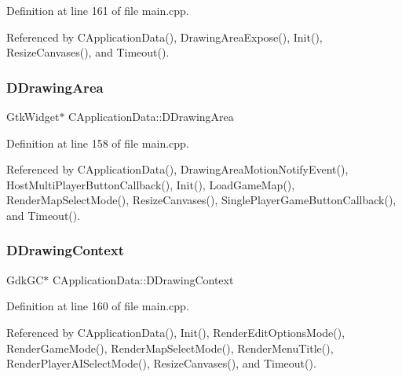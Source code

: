 Definition at line 161 of file main.\+cpp.



Referenced by C\+Application\+Data(), Drawing\+Area\+Expose(), Init(), Resize\+Canvases(), and Timeout().

\hypertarget{classCApplicationData_a4735f5d31632313e0b2a1659eb178987}{}\label{classCApplicationData_a4735f5d31632313e0b2a1659eb178987} 
\subsubsection{\texorpdfstring{D\+Drawing\+Area}{DDrawingArea}}
{\footnotesize\ttfamily Gtk\+Widget$\ast$ C\+Application\+Data\+::\+D\+Drawing\+Area\hspace{0.3cm}{\ttfamily [protected]}}



Definition at line 158 of file main.\+cpp.



Referenced by C\+Application\+Data(), Drawing\+Area\+Motion\+Notify\+Event(), Host\+Multi\+Player\+Button\+Callback(), Init(), Load\+Game\+Map(), Render\+Map\+Select\+Mode(), Resize\+Canvases(), Single\+Player\+Game\+Button\+Callback(), and Timeout().

\hypertarget{classCApplicationData_aa6c5bea9bdcc64398e5a3f693661d37c}{}\label{classCApplicationData_aa6c5bea9bdcc64398e5a3f693661d37c} 
\subsubsection{\texorpdfstring{D\+Drawing\+Context}{DDrawingContext}}
{\footnotesize\ttfamily Gdk\+GC$\ast$ C\+Application\+Data\+::\+D\+Drawing\+Context\hspace{0.3cm}{\ttfamily [protected]}}



Definition at line 160 of file main.\+cpp.



Referenced by C\+Application\+Data(), Init(), Render\+Edit\+Options\+Mode(), Render\+Game\+Mode(), Render\+Map\+Select\+Mode(), Render\+Menu\+Title(), Render\+Player\+A\+I\+Select\+Mode(), Resize\+Canvases(), and Timeout().

